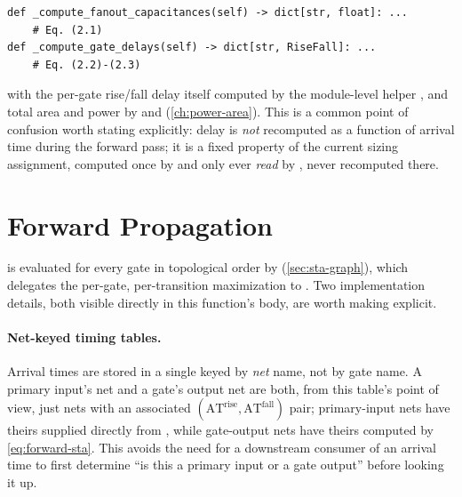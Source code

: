 \begin{lstlisting}[style=pythonstyle, numbers=none]
def _compute_fanout_capacitances(self) -> dict[str, float]: ...
    # Eq. (2.1)
def _compute_gate_delays(self) -> dict[str, RiseFall]: ...
    # Eq. (2.2)-(2.3)
\end{lstlisting}

with the per-gate rise/fall delay itself computed by the module-level
helper , and total area and power by
 and 
(\cref{ch:power-area}). This is a common point of confusion worth stating
explicitly: delay is \emph{not} recomputed as a function of arrival
time during the forward pass; it is a fixed property of the current sizing
assignment, computed once by  and only ever
\emph{read} by , never recomputed there.

\section{Forward Propagation}
\label{sec:sta-forward}

 is evaluated for every gate in topological order by
 (\cref{sec:sta-graph}), which delegates
the per-gate, per-transition maximization to
.
Two implementation details, both visible directly in this function's body,
are worth making explicit.

\paragraph{Net-keyed timing tables.} Arrival times are stored in a single
 keyed by \emph{net} name, not by gate name. A
primary input's net and a gate's output net are both, from this table's
point of view, just nets with an associated
$(\mathrm{AT}^{\mathrm{rise}}, \mathrm{AT}^{\mathrm{fall}})$
pair; primary-input nets have theirs supplied directly from
, while gate-output nets have
theirs computed by \cref{eq:forward-sta}. This avoids the need for a
downstream consumer of an arrival time to first determine ``is this a
primary input or a gate output'' before looking it up.

